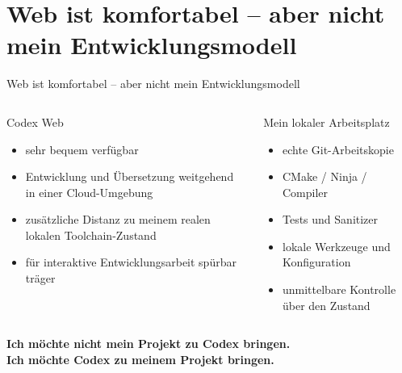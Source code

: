 \documentclass[\fhformat,10pt]{style/fh-ooe}
\begin{document}
\section{Web ist komfortabel -- aber nicht mein Entwicklungsmodell}
\begin{frame}{Web ist komfortabel -- aber nicht mein Entwicklungsmodell}
\begin{columns}[T]
\begin{block}{Codex Web}
\begin{itemize}
  \item sehr bequem verfügbar
  \item Entwicklung und Übersetzung weitgehend in einer Cloud-Umgebung
  \item zusätzliche Distanz zu meinem realen lokalen Toolchain-Zustand
  \item für interaktive Entwicklungsarbeit spürbar träger
\end{itemize}
\end{block}
\begin{block}{Mein lokaler Arbeitsplatz}
\begin{itemize}
  \item echte Git-Arbeitskopie
  \item CMake / Ninja / Compiler
  \item Tests und Sanitizer
  \item lokale Werkzeuge und Konfiguration
  \item unmittelbare Kontrolle über den Zustand
\end{itemize}
\end{block}
\end{columns}
\vspace{0.55em}
\begin{center}
\Large
\textbf{Ich möchte nicht mein Projekt zu Codex bringen.}\\[0.25em]
\color{fh-ooe-red}\textbf{Ich möchte Codex zu meinem Projekt bringen.}
\end{center}
\end{frame}

\end{document}
